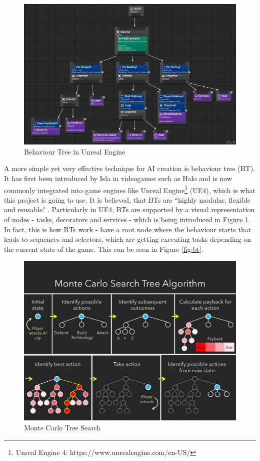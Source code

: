 \documentclass[journal]{IEEEtran}
\begin{document}
\begin{figure}
	\includegraphics[width=\linewidth]{Images/UnrealBehaviourTree.jpg}
	\caption{Behaviour Tree in Unreal Engine}
	\label{fig:ubt}
\end{figure}

A more simple yet very effective technique for AI creation is behaviour tree (BT). It has first been introduced by Isla \cite{gdchalo2} in videogames such as Halo and is now commonly integrated into game engines like Unreal Engine\footnote{\label{engine}Unreal Engine 4: https://www.unrealengine.com/en-US/} (UE4), which is what this project is going to use. It is believed, that BTs are ``highly modular, flexible and reusable" \cite{colledanchise2017behavior}. Particularly in UE4, BTs are supported by a visual representation of nodes - tasks, decorators and services - which is being introduced in Figure \ref{fig:ubt}. In fact, this is how BTs work - have a root node where the behaviour starts that leads to sequences and selectors, which are getting executing tasks depending on the current state of the game. This can be seen in Figure \ref{fig:bt}. %

\begin{figure}
	\includegraphics[width=\linewidth]{Images/MCTS.jpg}
	\caption{Monte Carlo Tree Search \cite{lou2017}}
	\label{fig:mcts}
\end{figure}
\end{document}
